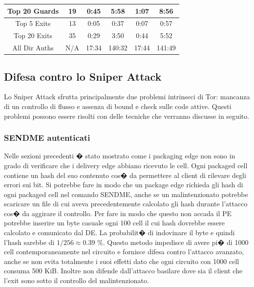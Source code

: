 \begin{table}[]
\begin{tabular}{cccccc}
\multicolumn{1}{|c|}{Top 20 Guards}     & \multicolumn{1}{c|}{19}     & \multicolumn{1}{c|}{0:45}  & \multicolumn{1}{c|}{5:58}   & \multicolumn{1}{c|}{1:07}  & \multicolumn{1}{c|}{8:56}   \\ \hline
\multicolumn{1}{|c|}{Top 5 Exits}       & \multicolumn{1}{c|}{13}     & \multicolumn{1}{c|}{0:05}  & \multicolumn{1}{c|}{0:37}   & \multicolumn{1}{c|}{0:07}  & \multicolumn{1}{c|}{0:57}   \\
\multicolumn{1}{|c|}{Top 20 Exits}      & \multicolumn{1}{c|}{35}     & \multicolumn{1}{c|}{0:29}  & \multicolumn{1}{c|}{3:50}   & \multicolumn{1}{c|}{0:44}  & \multicolumn{1}{c|}{5:52}   \\ \hline
\multicolumn{1}{|c|}{All Dir Auths}     & \multicolumn{1}{c|}{N/A}    & \multicolumn{1}{c|}{17:34} & \multicolumn{1}{c|}{140:32} & \multicolumn{1}{c|}{17:44} & \multicolumn{1}{c|}{141:49} \\ \hline
\end{tabular}
\end{table}

\subsection{Difesa contro lo Sniper Attack}
Lo Sniper Attack sfrutta principalmente due problemi intrinseci di Tor: mancanza di un controllo di flusso e assenza di bound e check sulle code attive. Questi problemi possono essere risolti con delle tecniche che verranno discusse in seguito.

\subsubsection{{\ttfamily SENDME} autenticati}
Nelle sezioni precedenti � stato mostrato come i packaging edge non sono in grado di verificare che i delivery edge abbiano ricevuto le cell. Ogni packaged cell contiene un hash del suo contenuto cos� da permettere al client di rilevare degli errori sui bit. Si potrebbe fare in modo che un package edge richieda gli hash di ogni packaged cell nel comando {\ttfamily SENDME}, anche se un malintenzionato potrebbe scaricare un file di cui aveva precedentemente calcolato gli hash durante l'attacco cos� da aggirare il controllo. Per fare in modo che questo non accada il PE potrebbe inserire un byte casuale ogni 100 cell il cui hash dovrebbe essere calcolato e comunicato dal DE. La probabilit� di indovinare il byte e quindi l'hash sarebbe di $1/256 \approx 0.39$ \%. Questo metodo impedisce di avere pi� di 1000 cell contemporaneamente nel circuito e fornisce difesa contro l'attacco avanzato, anche se non evita totalmente i suoi effetti dato che ogni circuito con 1000 cell consuma 500 KiB. Inoltre non difende dall'attacco basilare dove sia il client che l'exit sono sotto il controllo del malintenzionato.


